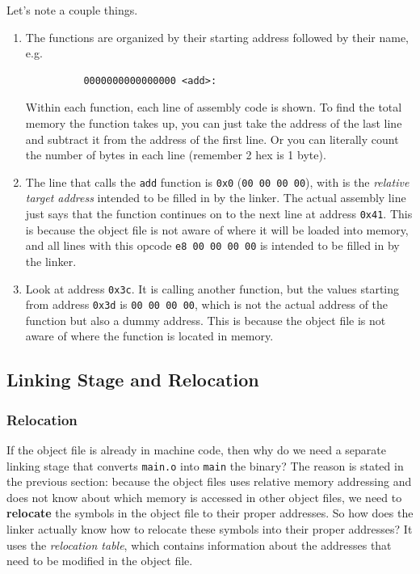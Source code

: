 \documentclass{article}
\begin{document}
    Let's note a couple things. 
    \begin{enumerate}
      \item The functions are organized by their starting address followed by their name, e.g.  
        \begin{lstlisting}
          0000000000000000 <add>:
        \end{lstlisting}
        Within each function, each line of assembly code is shown. To find the total memory the function takes up, you can just take the address of the last line and subtract it from the address of the first line. Or you can literally count the number of bytes in each line (remember 2 hex is 1 byte). 
      \item The line that calls the \texttt{add} function is \texttt{0x0} (\texttt{00 00 00 00}), with is the \textit{relative target address} intended to be filled in by the linker. The actual assembly line just says that the function continues on to the next line at address \texttt{0x41}. This is because the object file is not aware of where it will be loaded into memory, and all lines with this opcode \texttt{e8 00 00 00 00} is intended to be filled in by the linker. 
      \item Look at address \texttt{0x3c}. It is calling another function, but the values starting from address \texttt{0x3d} is \texttt{00 00 00 00}, which is not the actual address of the function but also a dummy address. This is because the object file is not aware of where the function is located in memory.
    \end{enumerate}

  \subsection{Linking Stage and Relocation}

    \subsubsection{Relocation}

      If the object file is already in machine code, then why do we need a separate linking stage that converts \texttt{main.o} into \texttt{main} the binary? The reason is stated in the previous section: because the object files uses relative memory addressing and does not know about which memory is accessed in other object files, we need to \textbf{relocate} the symbols in the object file to their proper addresses. So how does the linker actually know how to relocate these symbols into their proper addresses? It uses the \textit{relocation table}, which contains information about the addresses that need to be modified in the object file. 
\end{document}
